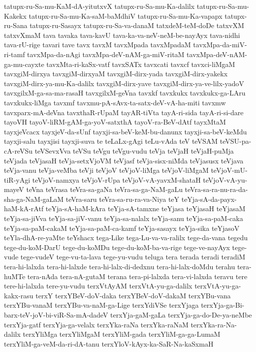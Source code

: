 {tatupx-ru-Sa-mu-KaM-dA-yitutxvX
tatupx-ru-Sa-mu-Ka-dalilx
tatupx-ru-Sa-mu-Kakekx
tatupx-ru-Sa-mu-Ka-saM-baMdhiV
tatupx-ru-Sa-mu-Ka-vapapx
tatupx-ru-Sana
tatupx-ru-Sasayx
tatupx-ru-Sa-va-danaM
tatxdeM-teM-doDe
tatxvXM
tatxvXmaM
tava
tavaka
tava-kavU
tava-ka-va-neV-neM-be-nayAyx
tava-nidhi
tava-rU-rige
tavari
tave
tavx
tavxM
tavxMpada
tavxMpadaM
tavxMpa-da-miV-ri-tamf
tavxMpa-da-nAgi
tavxMpa-deV-nAM-ga-miV-ritaM
tavxMpa-deV-nAM-ga-mu-cayxte
tavxMta-ri-kaSx-vatf
tavxSATx
tavxcati
tavxcf
tavxci-liMgaM
tavxgiM-dirxya
tavxgiM-dirxyaM
tavxgiM-dirx-yada
tavxgiM-dirx-yakekx
tavxgiM-dirx-ya-mu-Ka-dalilx
tavxgiM-dirx-yave
tavxgiM-dirx-ya-ve-lilx-yadoV
tavxgilxM-ga-sa-ma-rasaH
tavxgilxM-geVna
tavxkf
tavxkukx
tavxkukx-ga-LAru
tavxkukx-liMga
tavxmf
tavxmu-pA-sAvx-ta-satx-deV-vA-ha-miti
tavxmw
tavxparx-mA-deVna
tavxthaR-rUpaM
tayAR-tiVta
tayA-ri-sida
tayA-ri-si-dare
tayoVH
tayoV-liRM-gAM-ga-yoV-satxthA
tayoV-ra-BeV-dAtf
tayxMtaM
tayxjeVcacx
tayxjeV-da-sUnf
tayxji-sa-beV-keM-bu-danunx
tayxji-sa-beV-keMdu
tayxji-salu
tayxjisi
tayxji-suva
te
teLaLx-gAgi
teLu-vAda
teV
teVSAM
teVSU-pa-cA-reVSu
teVSevxVva
teVSu
teVgu
teVgu-vudu
teVja
teVjaH
teVjaH-puMja
teVjada
teVjasaH
teVja-setxVjoVM
teVjasf
teVja-sisx-niMda
teVjasusx
teVjava
teVja-vanu
teVja-veMba
teVji
teVjoV
teVjoV-liMga
teVjoV-liMgaM
teVjoV-mU-tiR-yAgi
teVjoV-namxya
teVjoV-rUpa
teVjoV-vA-yavxM-shataH
teVjoV-vA-yu-mayeV
teVna
teVrasa
teVra-sa-gaNa
teVra-sa-ga-NaM-gaLu
teVra-sa-ra-nu-ra-da-sha-ga-NaM-gaLaM
teVra-saru
teVra-sa-ru-ra-va-Niya
teY
teYja-sA-da-payx-haM-kA-rAtf
teYja-sA-haM-kAra
teYja-sA-tamxne
teYjasa
teYjasaH
teYjasaM
teYja-sa-jiVva
teYja-sa-jiV-vanu
teYja-sa-nalalx
teYja-sanu
teYja-sa-paM-caka
teYja-sa-paM-cakaM
teYja-sa-paM-ca-kamf
teYja-sasayx
teYja-sika
teYjasoV
teYla-dhA-re-yaMte
teYshacx
tega-Like
tega-Lu-va-va-ralilx
tege-da-vana
tegedu
tege-du-koM-DarU
tege-du-koMDu
tege-du-koM-ba-va-rige
tege-ve-nayAyx
tege-vude
tege-vudeV
tege-vu-ta-lava
tege-yu-vudu
teluga
tera
terada
teradi
teradiM
tera-hi-lalxda
tera-hi-lalxde
tera-hi-lalx-di-dedxnu
tera-hi-lalx-doMdu
terahu
tera-huMTe
tera-nAda
tera-nA-gutaM
terana
tera-pi-lalxda
tera-vi-lalxda
teravu
tere
tere-hi-lalxda
tere-yu-vudu
terxVtAyAM
terxVtA-yu-ga-dalilx
terxVtA-yu-ga-kakx-rasu
terxY
terxYBeV-doV-daka
terxYBeV-doV-dakaM
terxYBu-vana
terxYBu-vanaM
terxYBu-va-naM-ga-Lige
terxYdiVSe
terxYjaga
terxYja-ga-Bi-barx-teV-joV-bi-viR-Sa-mA-dadeV
terxYja-gaM-gaLa
terxYja-ga-do-De-ya-neMbe
terxYja-gatf
terxYja-ga-velalx
terxYka-raNa
terxYka-raNaM
terxYka-ra-Na-dalilx
terxYliMga
terxYliMgaM
terxYliM-gada
terxYliM-ga-ga-LumaM
terxYliM-ga-veM-da-ri-dA-tanu
terxYloV-kAyx-ka-SaR-Na-kaSxmaH
}
